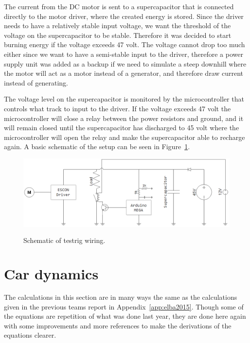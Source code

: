 The current from the DC motor is sent to a supercapacitor that is connected
directly to the motor driver, where the created energy is stored. Since the
driver needs to have a relatively stable input voltage, we want the threshold
of the voltage on the supercapacitor to be stable. Therefore it was decided to
start burning energy if the voltage exceeds 47 volt. The voltage cannot drop
too much either since we want to have a semi-stable input to the driver, therefore a power supply unit was added as a backup if we need
to simulate a steep downhill where the motor will act as a motor instead of a
generator, and therefore draw current instead of generating. 

The voltage level on the supercapacitor is monitored by the microcontroller
that controls what track to input to the driver. If the voltage exceeds 47 volt
the microcontroller will close a relay between the power resistors and ground,
and it will remain closed until the supercapacitor has discharged to 45 volt where
the microcontroller will open the relay and make the supercapacitor able to
recharge again. A basic schematic of the setup can be seen in
Figure~\ref{fig:testrig_schematic}.

\begin{figure}[H]
    \centering\label{fig:testrig_schematic}
    \includegraphics[width=\textwidth]{./img/testrig_schematic.png}
    \caption{Schematic of testrig wiring.}
\end{figure}

\section{Car dynamics}\label{sec:cardynamics}
The calculations in this section are in many ways the same as the calculations
given in the previous teams report in Appendix~\ref{app:elba2015}. Though some
of the equations are repetition of what was done last year, they are
done here again with some improvements and more references to make the
derivations of the equations clearer.

